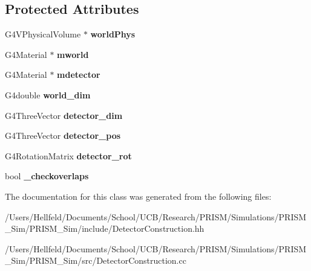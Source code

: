 \subsection*{Protected Attributes}
\begin{DoxyCompactItemize}
\item 
\hypertarget{class_detector_construction_a1a10548a1daef32cd566a3fdcba07cd7}{}\label{class_detector_construction_a1a10548a1daef32cd566a3fdcba07cd7} 
G4\+V\+Physical\+Volume $\ast$ {\bfseries world\+Phys}
\item 
\hypertarget{class_detector_construction_a5dcb068f4f80d532062eb7ec11a49b4a}{}\label{class_detector_construction_a5dcb068f4f80d532062eb7ec11a49b4a} 
G4\+Material $\ast$ {\bfseries mworld}
\item 
\hypertarget{class_detector_construction_ae8fdb511783bd31d3b430ba2a6bf39d8}{}\label{class_detector_construction_ae8fdb511783bd31d3b430ba2a6bf39d8} 
G4\+Material $\ast$ {\bfseries mdetector}
\item 
\hypertarget{class_detector_construction_a6a90b0ff0da8c387b6ee3d0c324fb4ae}{}\label{class_detector_construction_a6a90b0ff0da8c387b6ee3d0c324fb4ae} 
G4double {\bfseries world\+\_\+dim}
\item 
\hypertarget{class_detector_construction_a411b4a80cdd1233eca1b263dc9964d1a}{}\label{class_detector_construction_a411b4a80cdd1233eca1b263dc9964d1a} 
G4\+Three\+Vector {\bfseries detector\+\_\+dim}
\item 
\hypertarget{class_detector_construction_ad24de8ecffb0f690f28918f8c141161f}{}\label{class_detector_construction_ad24de8ecffb0f690f28918f8c141161f} 
G4\+Three\+Vector {\bfseries detector\+\_\+pos}
\item 
\hypertarget{class_detector_construction_a6402314fffad38b15d589778ef814dff}{}\label{class_detector_construction_a6402314fffad38b15d589778ef814dff} 
G4\+Rotation\+Matrix {\bfseries detector\+\_\+rot}
\item 
\hypertarget{class_detector_construction_ac91629e4e7bfb5e3ecd396dd556799c1}{}\label{class_detector_construction_ac91629e4e7bfb5e3ecd396dd556799c1} 
bool {\bfseries \+\_\+checkoverlaps}
\end{DoxyCompactItemize}


The documentation for this class was generated from the following files\+:\begin{DoxyCompactItemize}
\item 
/\+Users/\+Hellfeld/\+Documents/\+School/\+U\+C\+B/\+Research/\+P\+R\+I\+S\+M/\+Simulations/\+P\+R\+I\+S\+M\+\_\+\+Sim/\+P\+R\+I\+S\+M\+\_\+\+Sim/include/Detector\+Construction.\+hh\item 
/\+Users/\+Hellfeld/\+Documents/\+School/\+U\+C\+B/\+Research/\+P\+R\+I\+S\+M/\+Simulations/\+P\+R\+I\+S\+M\+\_\+\+Sim/\+P\+R\+I\+S\+M\+\_\+\+Sim/src/Detector\+Construction.\+cc\end{DoxyCompactItemize}
